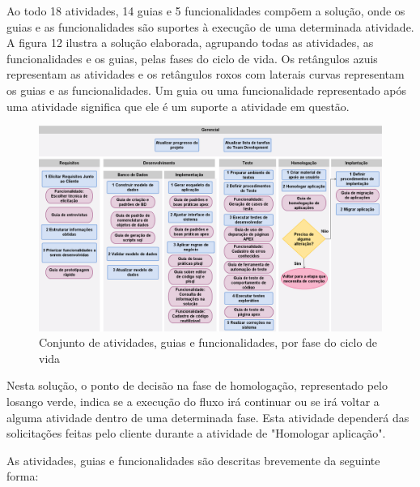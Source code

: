 Ao todo 18 atividades, 14 guias e 5 funcionalidades compõem a solução, onde os guias e as funcionalidades são suportes à execução de uma determinada atividade. A figura 12 ilustra a solução elaborada, agrupando todas as atividades, as funcionalidades e os guias, pelas fases do ciclo de vida. Os retângulos azuis representam as atividades e os retângulos roxos com laterais curvas representam os guias e as funcionalidades. Um guia ou uma funcionalidade representado após uma atividade significa que ele é um suporte a atividade em questão.
\clearpage

\begin{landscape}
\begin{figure}[!htb]
	\centering
		\includegraphics[scale=0.4]{figuras/fluxograma_solucao}
	\caption{Conjunto de atividades, guias e funcionalidades, por fase do ciclo de vida}
\end{figure}
\end{landscape}

Nesta solução, o ponto de decisão na fase de homologação, representado pelo losango verde, indica se a execução do fluxo irá continuar ou se irá voltar a alguma atividade dentro de uma determinada fase. Esta atividade dependerá das solicitações feitas pelo cliente durante a atividade de "Homologar aplicação".

As atividades, guias e funcionalidades são descritas brevemente da seguinte forma:

